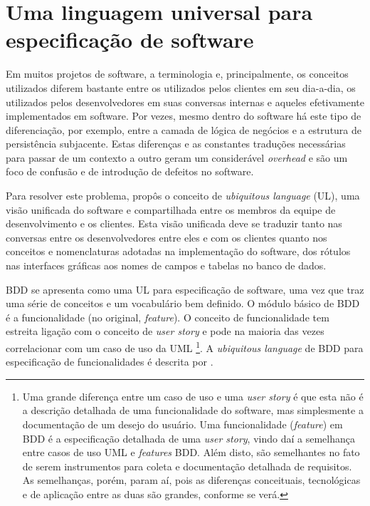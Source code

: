 \documentclass[a4paper,abntfigtabnum,noindentfirst]{abnt}
\begin{document}
\section*{Uma linguagem universal para especificação de software}

Em muitos projetos de software, a terminologia e, principalmente, os conceitos utilizados diferem bastante entre os utilizados pelos clientes em seu dia-a-dia, os utilizados pelos desenvolvedores em suas conversas internas e aqueles efetivamente implementados em software. Por vezes, mesmo dentro do software há este tipo de diferenciação, por exemplo, entre a camada de lógica de negócios e a estrutura de persistência subjacente. Estas diferenças e as constantes traduções necessárias para passar de um contexto a outro geram um considerável \textit{overhead} e são um foco de confusão e de introdução de defeitos no software.

Para resolver este problema,  propôs o conceito de \textit{ubiquitous language} (UL), uma visão unificada do software e compartilhada entre os membros da equipe de desenvolvimento e os clientes. Esta visão unificada deve se traduzir tanto nas conversas entre os desenvolvedores entre eles e com os clientes quanto nos conceitos e nomenclaturas adotadas na implementação do software, dos rótulos nas interfaces gráficas aos nomes de campos e tabelas no banco de dados.

BDD se apresenta como uma UL para especificação de software, uma vez que traz uma série de conceitos e um vocabulário bem definido. O módulo básico de BDD é a funcionalidade (no original, \textit{feature}). O conceito de funcionalidade tem estreita ligação com o conceito de \textit{user story} \cite{XP2ndEd} \cite{UserStoriesApplied} e pode na maioria das vezes correlacionar com um caso de uso da UML \cite{UML}\footnote{Uma grande diferença entre um caso de uso e uma \textit{user story} é que esta não é a descrição detalhada de uma funcionalidade do software, mas simplesmente a documentação de um desejo do usuário. Uma funcionalidade (\textit{feature}) em BDD é a especificação detalhada de uma \textit{user story}, vindo daí a semelhança entre casos de uso UML e \textit{features} BDD.  Além disto, são semelhantes no fato de serem instrumentos para coleta e documentação detalhada de requisitos. As semelhanças, porém, param aí, pois as diferenças conceituais, tecnológicas e de aplicação entre as duas são grandes, conforme se verá.}. A \textit{ubiquitous language} de BDD para especificação de funcionalidades é descrita por .
\end{document}
